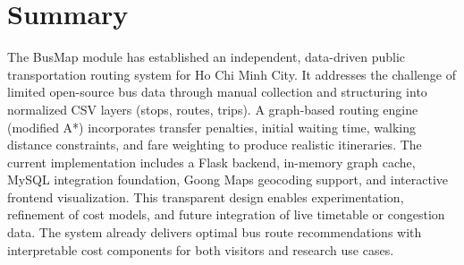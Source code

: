 \section{Summary}

The BusMap module has established an independent, data-driven public transportation routing system for Ho Chi Minh City. It addresses the challenge of limited open-source bus data through manual collection and structuring into normalized CSV layers (stops, routes, trips). A graph-based routing engine (modified A*) incorporates transfer penalties, initial waiting time, walking distance constraints, and fare weighting to produce realistic itineraries. The current implementation includes a Flask backend, in-memory graph cache, MySQL integration foundation, Goong Maps geocoding support, and interactive frontend visualization. This transparent design enables experimentation, refinement of cost models, and future integration of live timetable or congestion data. The system already delivers optimal bus route recommendations with interpretable cost components for both visitors and research use cases.


